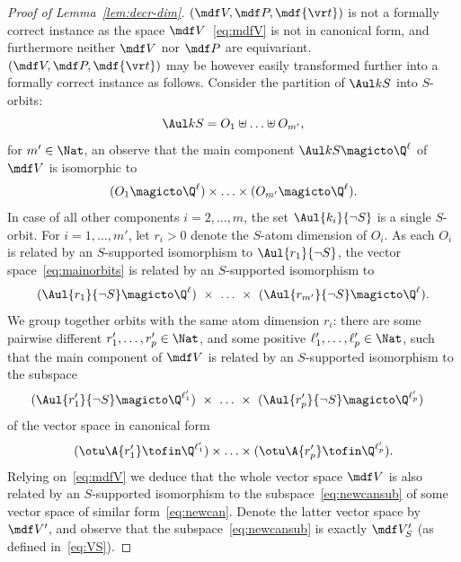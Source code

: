 \begin{proof}[Proof of Lemma~\ref{lem:decr-dim}]
$(\mdf V, \mdf P, \mdf{\vr t})$ is not a formally correct instance as the space $\mdf V$~\eqref{eq:mdfV} 
is not in canonical form, and furthermore neither $\mdf V$ nor $\mdf P$ are equivariant.
$(\mdf V, \mdf P, \mdf{\vr t})$ may be however easily  transformed further into a formally correct instance as follows. 
Consider the partition of $\Aul k S$ into $S$-orbits:
\[
\Aul k S = O_1 \uplus \ldots \uplus O_{m'},
\]
%
for $m'\in\Nat$,
an observe that the main component $\Aul k S \magicto \Q^\ell$ of $\mdf V$ is isomorphic to
%
\begin{align} \label{eq:mainorbits}
(O_1 \magicto \Q^\ell) \times \ldots \times (O_{m'} \magicto \Q^\ell).
\end{align}
%
In case of all other components $i=2,\ldots, m$, the set $\Aul {k_i} {\neg S}$ is a single $S$-orbit.
For $i = 1, \ldots, m'$, let $r_i > 0$ denote the $S$-atom dimension of $O_i$.
As each $O_i$ is related by an $S$-supported isomorphism to $\Aul {r_1} {\neg S}$, 
the vector space~\eqref{eq:mainorbits} is related by an $S$-supported isomorphism to
\[
(\Aul {r_1} {\neg S} \magicto \Q^\ell) \ \times \ \ldots \ \times \ 
(\Aul {r_{m'}} {\neg S} \magicto \Q^\ell).
\]
We group together orbits with the same atom dimension $r_i$:
there are some pairwise different $r'_1, \ldots, r'_p\in\Nat$, and some positive  $\ell'_1, \ldots, \ell'_p\in\Nat$, such that
the main component of $\mdf V$ is 
related by an $S$-supported isomorphism to the subspace 
%
\begin{align} \label{eq:newcansub}
({\Aul {r'_1} {\neg S}} \magicto \Q^{\ell'_1}) \ %
 \times \ \ldots \ \times \ 
({\Aul {r'_p} {\neg S}} \magicto \Q^{\ell'_p})&
\end{align}
%
of the vector space in canonical form
%
\begin{align} \label{eq:newcan}
({\otu \A {r'_1}} \tofin \Q^{\ell'_1})  %
\times  \ldots  \times  
({\otu \A {r'_p}} \tofin \Q^{\ell'_p}).
\end{align}
%
Relying on~\eqref{eq:mdfV} we deduce that the whole vector space $\mdf V$ is also related by an $S$-supported isomorphism to
the subspace~\eqref{eq:newcansub} of some vector space of similar form~\eqref{eq:newcan}.
Denote the latter vector space by $\mdf V'$, and observe that the subspace~\eqref{eq:newcansub} is 
exactly $\mdf V'_S$ (as defined in~\eqref{eq:VS}).


\end{proof}
